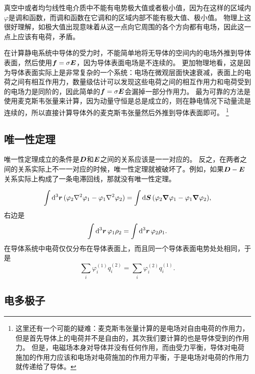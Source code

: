 \documentclass[UTF8, a4paper]{ctexart}
\begin{document}
真空中或者均匀线性电介质中不能有电势极大值或者极小值，因为在这样的区域内$\varphi$是调和函数，而调和函数在它调和的区域内部不能有极大值、极小值。
物理上这很好理解，如极大值出现意味着从这一点向它周围的各个方向都有电场，因此这一点上应该有电荷，矛盾。

在计算静电系统中导体的受力时，不能简单地将无导体的空间内的电场外推到导体表面，然后使用$\vb*{f}=\sigma\vb*{E}$，因为导体表面电场是不连续的。
更加物理地看，这是因为导体表面实际上是非常复杂的一个系统：电场在微观层面快速衰减，表面上的电荷之间有相互作用力，数量级估计可以发现这些电荷之间的相互作用力和电荷受到的电场力是同阶的，因此简单的$\vb*{f}=\sigma\vb*{E}$会漏掉一部分作用力。
最为可靠的方法是使用麦克斯韦张量来计算，因为动量守恒是总是成立的，则在静电情况下动量流是连续的，所以直接计算导体外的麦克斯韦张量然后外推到导体表面即可。%
\footnote{
    这里还有一个可能的疑难：麦克斯韦张量计算的是电场对自由电荷的作用力，但是首先导体上的电荷并不是自由的，其次我们要计算的也是导体受到的作用力。
    但是，电磁场本身对导体并没有任何作用，而由受力平衡，导体对电荷施加的作用力应该和电场对电荷施加的作用力平衡，于是电场对电荷的作用力就传递给了导体。
}%

\subsection{唯一性定理}

唯一性定理成立的条件是$\vb*{D}$和$\vb*{E}$之间的关系应该是一一对应的。
反之，在两者之间的关系实际上不一一对应的时候，唯一性定理就被破坏了。例如，如果$\vb*{D}-\vb*{E}$关系实际上构成了一条电滞回线，那就没有唯一性定理。


\[
    \int \dd[3]{\vb*{r}} (\varphi_2 \laplacian{\varphi_1} - \varphi_1 \laplacian{\varphi_2}) = \int \dd{\vb*{S}} (\varphi_2 \grad{\varphi_1} - \varphi_1 \grad{\varphi_2}),
\]
右边是
\begin{equation}
    \int \dd[3]{\vb*{r}} \varphi_1 \rho_2 = \int \dd[3]{\vb*{r}} \varphi_2 \rho_1.
\end{equation}
在导体系统中电荷仅仅分布在导体表面上，而且同一个导体表面电势处处相同，于是
\begin{equation}
    \sum_i \varphi_i^{(1)} q_i^{(2)} = \sum_i \varphi_i^{(2)} q_i^{(1)}.
\end{equation}

\subsection{电多极子}
\end{document}
